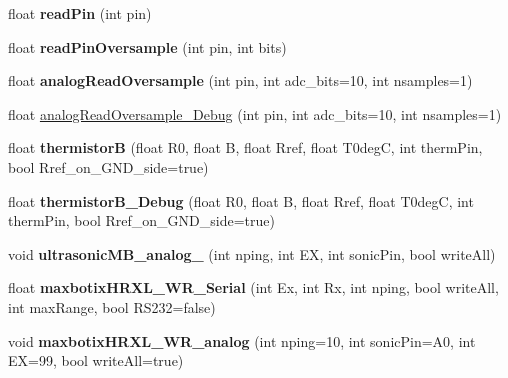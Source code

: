 \begin{DoxyCompactItemize}
\item 
float {\bfseries read\+Pin} (int pin)\hypertarget{classLogger_a343fcabefb37e06429865a2e6a6e708a}{}\label{classLogger_a343fcabefb37e06429865a2e6a6e708a}

\item 
float {\bfseries read\+Pin\+Oversample} (int pin, int bits)\hypertarget{classLogger_a4e67526c65fa865f276a515a200af4aa}{}\label{classLogger_a4e67526c65fa865f276a515a200af4aa}

\item 
float {\bfseries analog\+Read\+Oversample} (int pin, int adc\+\_\+bits=10, int nsamples=1)\hypertarget{classLogger_afd26c9895a3b0314413c28a9fe236e2a}{}\label{classLogger_afd26c9895a3b0314413c28a9fe236e2a}

\item 
float \hyperlink{classLogger_a02c147268f3bd5bd55b8c632c9e5ab9f}{analog\+Read\+Oversample\+\_\+\+Debug} (int pin, int adc\+\_\+bits=10, int nsamples=1)
\item 
float {\bfseries thermistorB} (float R0, float B, float Rref, float T0degC, int therm\+Pin, bool Rref\+\_\+on\+\_\+\+G\+N\+D\+\_\+side=true)\hypertarget{classLogger_a0b35b861394160fb080afd78a1dea500}{}\label{classLogger_a0b35b861394160fb080afd78a1dea500}

\item 
float {\bfseries thermistor\+B\+\_\+\+Debug} (float R0, float B, float Rref, float T0degC, int therm\+Pin, bool Rref\+\_\+on\+\_\+\+G\+N\+D\+\_\+side=true)\hypertarget{classLogger_aeb80eea2ce978d61a67b1c5904ba4428}{}\label{classLogger_aeb80eea2ce978d61a67b1c5904ba4428}

\item 
void {\bfseries ultrasonic\+M\+B\+\_\+analog\+\_\+1cm} (int nping, int EX, int sonic\+Pin, bool write\+All)\hypertarget{classLogger_a362a1462166d63ddc613eaa1e86f9854}{}\label{classLogger_a362a1462166d63ddc613eaa1e86f9854}

\item 
float {\bfseries maxbotix\+H\+R\+X\+L\+\_\+\+W\+R\+\_\+\+Serial} (int Ex, int Rx, int nping, bool write\+All, int max\+Range, bool R\+S232=false)\hypertarget{classLogger_a302ced2e1130c711f4ae1f8b1fc2b2a0}{}\label{classLogger_a302ced2e1130c711f4ae1f8b1fc2b2a0}

\item 
void {\bfseries maxbotix\+H\+R\+X\+L\+\_\+\+W\+R\+\_\+analog} (int nping=10, int sonic\+Pin=A0, int EX=99, bool write\+All=true)\hypertarget{classLogger_acd4f2c5017d9a36b88ab345082b4551f}{}\label{classLogger_acd4f2c5017d9a36b88ab345082b4551f}


\end{DoxyCompactItemize}
